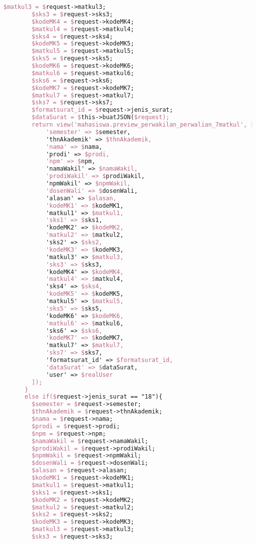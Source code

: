 \begin{lstlisting}[language=tex,basicstyle=\tiny,caption=PesanansuratController.php]
        $matkul3 = $request->matkul3;
        $sks3 = $request->sks3;
        $kodeMK4 = $request->kodeMK4;
        $matkul4 = $request->matkul4;
        $sks4 = $request->sks4;
        $kodeMK5 = $request->kodeMK5;
        $matkul5 = $request->matkul5;
        $sks5 = $request->sks5;
        $kodeMK6 = $request->kodeMK6;
        $matkul6 = $request->matkul6;
        $sks6 = $request->sks6;
        $kodeMK7 = $request->kodeMK7;
        $matkul7 = $request->matkul7;
        $sks7 = $request->sks7;
        $formatsurat_id = $request->jenis_surat;
        $dataSurat = $this->buatJSON($request);
        return view('mahasiswa.preview_perwakilan_perwalian_7matkul', [
            'semester' => $semester,
            'thnAkademik' => $thnAkademik,
            'nama' => $nama,
            'prodi' => $prodi,
            'npm' => $npm,
            'namaWakil' => $namaWakil,
            'prodiWakil' => $prodiWakil,
            'npmWakil' => $npmWakil,
            'dosenWali' => $dosenWali,
            'alasan' => $alasan,
            'kodeMK1' => $kodeMK1,
            'matkul1' => $matkul1,
            'sks1' => $sks1,
            'kodeMK2' => $kodeMK2,
            'matkul2' => $matkul2,
            'sks2' => $sks2,
            'kodeMK3' => $kodeMK3,
            'matkul3' => $matkul3,
            'sks3' => $sks3,
            'kodeMK4' => $kodeMK4,
            'matkul4' => $matkul4,
            'sks4' => $sks4,
            'kodeMK5' => $kodeMK5,
            'matkul5' => $matkul5,
            'sks5' => $sks5,
            'kodeMK6' => $kodeMK6,
            'matkul6' => $matkul6,
            'sks6' => $sks6,
            'kodeMK7' => $kodeMK7,
            'matkul7' => $matkul7,
            'sks7' => $sks7,
            'formatsurat_id' => $formatsurat_id,
            'dataSurat' => $dataSurat,
            'user' => $realUser
        ]);
      }
      else if($request->jenis_surat == "18"){
        $semester = $request->semester;
        $thnAkademik = $request->thnAkademik;
        $nama = $request->nama;
        $prodi = $request->prodi;
        $npm = $request->npm;
        $namaWakil = $request->namaWakil;
        $prodiWakil = $request->prodiWakil;
        $npmWakil = $request->npmWakil;
        $dosenWali = $request->dosenWali;
        $alasan = $request->alasan;
        $kodeMK1 = $request->kodeMK1;
        $matkul1 = $request->matkul1;
        $sks1 = $request->sks1;
        $kodeMK2 = $request->kodeMK2;
        $matkul2 = $request->matkul2;
        $sks2 = $request->sks2;
        $kodeMK3 = $request->kodeMK3;
        $matkul3 = $request->matkul3;
        $sks3 = $request->sks3;

\end{lstlisting}

